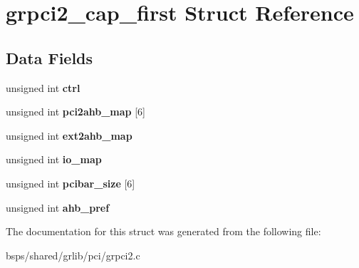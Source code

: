 \hypertarget{structgrpci2__cap__first}{}\section{grpci2\+\_\+cap\+\_\+first Struct Reference}
\label{structgrpci2__cap__first}
\subsection*{Data Fields}
\begin{DoxyCompactItemize}
\item 
\mbox{\label{structgrpci2__cap__first_a233aeb1bc9a7886f04f7be5208d01297}} 
unsigned int {\bfseries ctrl}
\item 
\mbox{\label{structgrpci2__cap__first_a8980574ea0969704754b30c9a90379d7}} 
unsigned int {\bfseries pci2ahb\+\_\+map} \mbox{[}6\mbox{]}
\item 
\mbox{\label{structgrpci2__cap__first_ac1a8072a9e86e9cf9b35b81ba667b4eb}} 
unsigned int {\bfseries ext2ahb\+\_\+map}
\item 
\mbox{\label{structgrpci2__cap__first_afeaa27300eb5868a2996fd9126130a34}} 
unsigned int {\bfseries io\+\_\+map}
\item 
\mbox{\label{structgrpci2__cap__first_af410f45e13195610477618644a62d0b0}} 
unsigned int {\bfseries pcibar\+\_\+size} \mbox{[}6\mbox{]}
\item 
\mbox{\label{structgrpci2__cap__first_a1d5a335b9bee8428778564e88f7ae17d}} 
unsigned int {\bfseries ahb\+\_\+pref}
\end{DoxyCompactItemize}


The documentation for this struct was generated from the following file\+:\begin{DoxyCompactItemize}
\item 
bsps/shared/grlib/pci/grpci2.\+c\end{DoxyCompactItemize}
